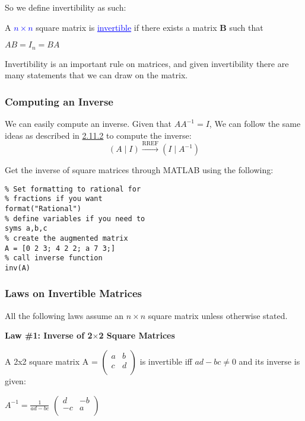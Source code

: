 \documentclass{article}
\newcommand{\bul}[1]{\textcolor{blue}{\underline{#1}}}
\newcommand{\sub}[1]{\vspace{10pt}\textbf{#1}}
\begin{document}
So we define invertibility as such:

A \bul{$n\times n$} square matrix is \bul{invertible} if there exists a matrix \textbf{B} such that
\begin{center}
    $AB = I_n = BA$
\end{center}

Invertibility is an important rule on matrices, and given invertibility there are many statements that we can draw on the matrix.

\subsubsection{Computing an Inverse}
We can easily compute an inverse. Given that $AA^{-1}=I$, We can follow the same ideas as described in \hyperref[sec:ubmtsme]{2.11.2} to compute the inverse:
\[
\left( A \mid I \right) \xrightarrow{\text{RREF}} \left( I \mid A^{-1} \right)
\]

\begin{tcolorbox}[title=MATLAB tip, colback=blue!5, colframe=blue!80!black]
    Get the inverse of square matrices through MATLAB using the following:
    \begin{lstlisting}
% Set formatting to rational for
% fractions if you want
format("Rational")
% define variables if you need to
syms a,b,c
% create the augmented matrix 
A = [0 2 3; 4 2 2; a 7 3;]
% call inverse function
inv(A)
    \end{lstlisting}
\end{tcolorbox}


\subsubsection{Laws on Invertible Matrices}
All the following laws assume an $n\times n$ square matrix unless otherwise stated.


\sub{Law \#1: Inverse of 2$\times$2 Square Matrices}

A 2x2 square matrix A = 
\(
\begin{pmatrix}
    a & b \\
    c & d \\
\end{pmatrix}
\)
is invertible iff $ad - bc \neq 0$ and its inverse is given:

\vspace{10pt}
\begin{center}
    $A^{-1} = \frac{1}{ad - bc}$
    \(
    \begin{pmatrix}
        d & -b \\
        -c & a \\
    \end{pmatrix}
    \)
\end{center}
\end{document}
